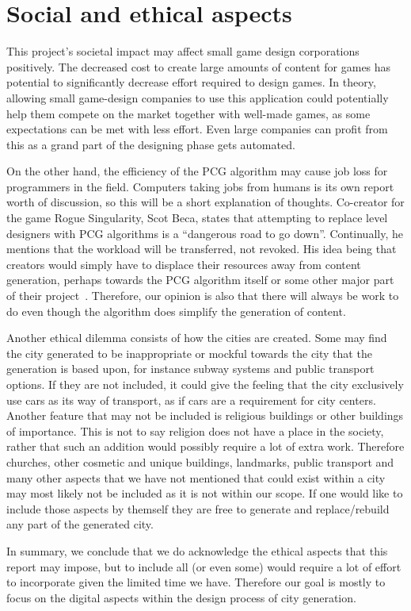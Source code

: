 \section{Social and ethical aspects}
This project's societal impact may affect small game design corporations positively.
The decreased cost to create large amounts of content for games has potential to significantly decrease effort required to design games.
In theory, allowing small game-design companies to use this application could potentially help them compete on the market together with well-made games, as some expectations can be met with less effort.
Even large companies can profit from this as a grand part of the designing phase gets automated.

On the other hand, the efficiency of the PCG algorithm may cause job loss for programmers in the field.
Computers taking jobs from humans is its own report worth of discussion, so this will be a short explanation of thoughts.
Co-creator for the game Rogue Singularity, Scot Beca, states that attempting to replace level designers with PCG algorithms is a ``dangerous road to go down''.
Continually, he mentions that the workload will be transferred, not revoked.
His idea being that creators would simply have to displace their resources away from content generation, perhaps towards the PCG algorithm itself or some other major part of their project~\cite{Gamasutra}.
Therefore, our opinion is also that there will always be work to do even though the algorithm does simplify the generation of content.

Another ethical dilemma consists of how the cities are created.
Some may find the city generated to be inappropriate or mockful towards the city that the generation is based upon, for instance subway systems and public transport options.
If they are not included, it could give the feeling that the city exclusively use cars as its way of transport, as if cars are a requirement for city centers.
Another feature that may not be included is religious buildings or other buildings of importance.
This is not to say religion does not have a place in the society, rather that such an addition would possibly require a lot of extra work.
Therefore churches, other cosmetic and unique buildings, landmarks, public transport and many other aspects that we have not mentioned that could exist within a city may most likely not be included as it is not within our scope.
If one would like to include those aspects by themself they are free to generate and replace/rebuild any part of the generated city.

In summary, we conclude that we do acknowledge the ethical aspects that this report may impose, but to include all (or even some) would require a lot of effort to incorporate given the limited time we have.
Therefore our goal is mostly to focus on the digital aspects within the design process of city generation.